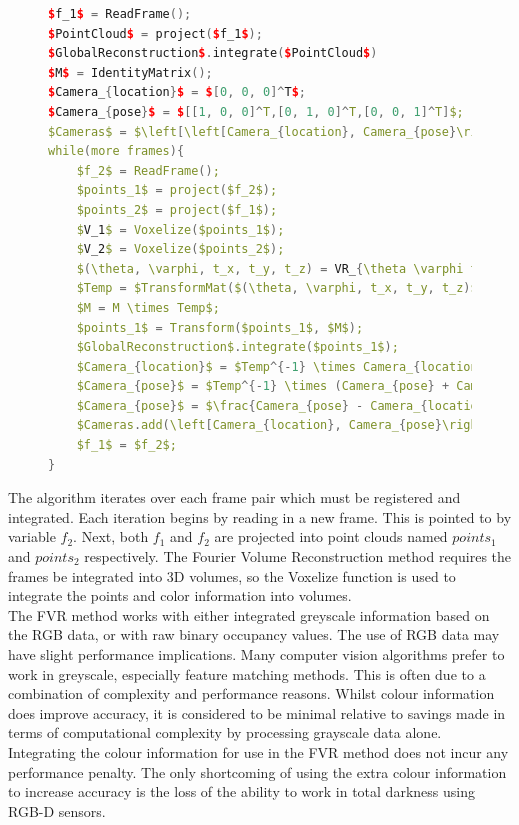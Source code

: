 \begin{figure}
\begin{lstlisting}[language=c++,caption=Phase Correlation Based SLAM Algorithm,label=algorithm:PCSLAMNo1,mathescape,basicstyle=\ttfamily]
$f_1$ = ReadFrame();
$PointCloud$ = project($f_1$);
$GlobalReconstruction$.integrate($PointCloud$)
$M$ = IdentityMatrix();
$Camera_{location}$ = $[0, 0, 0]^T$;
$Camera_{pose}$ = $[[1, 0, 0]^T,[0, 1, 0]^T,[0, 0, 1]^T]$;
$Cameras$ = $\left[\left[Camera_{location}, Camera_{pose}\right] \right]$;
while(more frames){
	$f_2$ = ReadFrame();
	$points_1$ = project($f_2$);
	$points_2$ = project($f_1$);
	$V_1$ = Voxelize($points_1$);
	$V_2$ = Voxelize($points_2$);
	$(\theta, \varphi, t_x, t_y, t_z) = VR_{\theta \varphi t_x t_y t_z}(V_1, V_2)$;
	$Temp = $TransformMat($(\theta, \varphi, t_x, t_y, t_z)$);
	$M = M \times Temp$;
	$points_1$ = Transform($points_1$, $M$);
	$GlobalReconstruction$.integrate($points_1$);
	$Camera_{location}$ = $Temp^{-1} \times Camera_{location}$;
	$Camera_{pose}$ = $Temp^{-1} \times (Camera_{pose} + Camera_{location})$;
	$Camera_{pose}$ = $\frac{Camera_{pose} - Camera_{location}}{Camera_{pose} - Camera_{location}}$;
	$Cameras.add(\left[Camera_{location}, Camera_{pose}\right])$;
	$f_1$ = $f_2$;
}
\end{lstlisting}
\end{figure}

The algorithm iterates over each frame pair which must be registered and integrated. Each iteration begins by reading in a new frame. This is pointed to by variable $f_2$. Next, both $f_1$ and $f_2$ are projected into point clouds named $points_1$ and $points_2$ respectively. The Fourier Volume Reconstruction method requires the frames be integrated into 3D volumes, so the Voxelize function is used to integrate the points and color information into volumes. \\

The FVR method works with either integrated greyscale information based on the RGB data, or with raw binary occupancy values. The use of RGB data may have slight performance implications. Many computer vision algorithms prefer to work in greyscale, especially feature matching methods. This is often due to a combination of complexity and performance reasons. Whilst colour information does improve accuracy, it is considered to be minimal relative to savings made in terms of computational complexity by processing grayscale data alone. \\

Integrating the colour information for use in the FVR method does not incur any performance penalty. The only shortcoming of using the extra colour information to increase accuracy is the loss of the ability to work in total darkness using RGB-D sensors. \\


